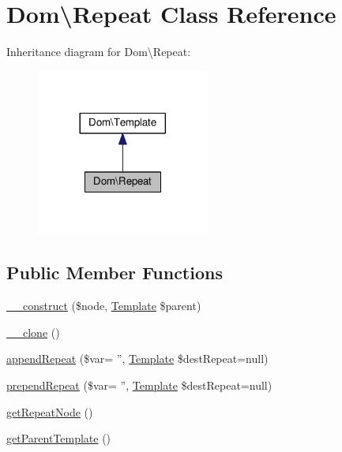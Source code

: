 \hypertarget{classDom_1_1Repeat}{\section{Dom\textbackslash{}Repeat Class Reference}
\label{classDom_1_1Repeat}
}


Inheritance diagram for Dom\textbackslash{}Repeat\+:\nopagebreak
\begin{figure}[H]
\begin{center}
\leavevmode
\includegraphics[width=161pt]{classDom_1_1Repeat__inherit__graph}
\end{center}
\end{figure}
\subsection*{Public Member Functions}
\begin{DoxyCompactItemize}
\item 
\hyperlink{classDom_1_1Repeat_a1aa663f67376110c386ade0e9d8a29c0}{\+\_\+\+\_\+construct} (\$node, \hyperlink{classDom_1_1Template}{Template} \$parent)
\item 
\hyperlink{classDom_1_1Repeat_ac0abfe107698376b5a5d1d7d1d78305f}{\+\_\+\+\_\+clone} ()
\item 
\hyperlink{classDom_1_1Repeat_a36789b9cd47962477bef49a32ce409f4}{append\+Repeat} (\$var= '', \hyperlink{classDom_1_1Template}{Template} \$dest\+Repeat=null)
\item 
\hyperlink{classDom_1_1Repeat_a0bb511b01c60717baef9cfca0a4c3335}{prepend\+Repeat} (\$var= '', \hyperlink{classDom_1_1Template}{Template} \$dest\+Repeat=null)
\item 
\hyperlink{classDom_1_1Repeat_a69e4747ce865f7e6f701c4dc270839fc}{get\+Repeat\+Node} ()
\item 
\hyperlink{classDom_1_1Repeat_a487bdd77112fcd866d4f20b7acc29dc3}{get\+Parent\+Template} ()
\end{DoxyCompactItemize}
